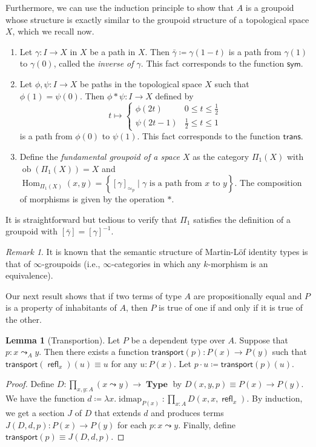 \documentclass[10pt,letterpaper,cm]{nupset}
\theoremstyle{definition}
\theoremstyle{theorem}
\newtheorem{lemma}[definition]{Lemma}
\theoremstyle{remark}
\newtheorem{remark}[definition]{Remark}
\newcommand{\1}{\mathbf{1}}
\newcommand{\0}{\vec 0}
\DeclareMathOperator{\idmap}{idmap}
\DeclareMathOperator{\ob}{ob}
\DeclareMathOperator{\refl}{\mathsf{refl}}
\DeclareMathOperator{\Hom}{Hom}
\DeclareMathOperator{\type}{\mathbf{Type}}
\begin{document}
Furthermore, we can use the induction principle to show that $A$ is a groupoid whose structure is exactly similar to the groupoid structure of a topological space $X$, which we recall now.
\begin{enumerate}
\item Let $\gamma : I \to X$ in $X$ be a path in $X$. Then $\bar{\gamma}\coloneqq \gamma(1-t)$ is a path from $\gamma(1)$ to $\gamma(0)$, called the \textit{inverse of $\gamma$}. This fact corresponds to the function $\mathsf{sym}$. 
\item Let $\phi, \psi: I \to X$ be paths in the topological space $X$ such that $\phi(1) = \psi(0)$. Then $\phi \ast \psi : I \to X$ defined by  $$t\mapsto  \begin{cases} \phi(2t) & 0\leq t \leq \frac{1}{2} \\ \psi(2t-1) & \frac{1}{2} \leq t \leq 1 \end{cases}$$ is a path from $\phi(0)$ to $\psi(1)$. This fact corresponds to the function $\mathsf{trans}$.
\item Define the \textit{fundamental groupoid of a space $X$} as the category $\Pi_1(X)$ with $\ob(\Pi_1(X)) = X$ and $\Hom_{\Pi_1(X)}(x,y) = \left\{[\gamma]_{\simeq_p} \mid \gamma \text{ is a path from }x \text{ to }y\right\}$. The composition of morphisms is given by the operation $\ast$. 
\end{enumerate}
It is straightforward but tedious to verify that $\Pi_1$ satisfies the definition of a groupoid with $\left[\bar{\gamma}\right] = \left[\gamma\right]^{{-}1}$.

\begin{remark}
 It is known that the semantic structure of Martin-L\"of identity types is that of $\infty$-groupoids (i.e., $\infty$-categories in which any $k$-morphism is an equivalence).
\end{remark}

\medskip

Our next result shows that if two terms of type $A$ are propositionally equal and $P$ is a property of inhabitants of $A$, then $P$ is true of one if and only if it is true of the other.

\begin{lemma}[Transportion]
Let $P$ be a dependent type over $A$. Suppose that $p: x\leadsto_A y$. Then there exists a function $\mathsf{transport}(p) : P(x) \to P(y)$ such that $\mathsf{transport}(\refl_x)(u) \equiv u$ for any $u: P(x)$. Let $p \cdot u \coloneqq \mathsf{transport}(p)(u)$.
\end{lemma}
\begin{proof}
Define $D: \prod_{x,y:A}(x\leadsto y) \to \type$ by  $D(x,y,p) \equiv P(x) \to P(y)$. We have the function $d\coloneqq \lambda x.\idmap_{P(x)} :\prod_{x:A}D(x,x,\refl_x)$. By induction, we get a section $J$ of $D$ that extends $d$ and produces terms $J(D,d,p) :P(x) \to P(y)$ for each $p: x\leadsto y$. Finally, define $\mathsf{transport}(p) \equiv J(D,d,p)$.
\end{proof}
\end{document}
